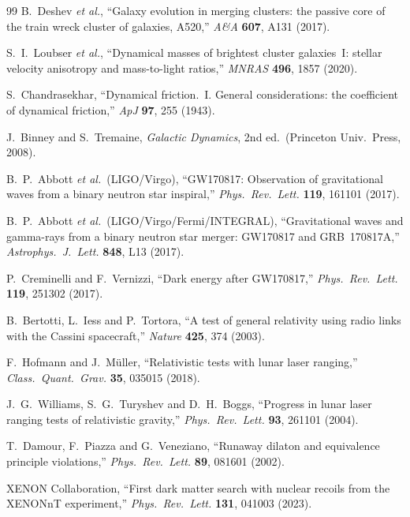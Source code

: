 \documentclass[aps,prd,twocolumn,nofootinbib,floatfix,superscriptaddress]{revtex4-2}
\begin{document}
\begin{thebibliography}{99}
 B.~Deshev \emph{et al.}, ``Galaxy evolution in
merging clusters: the passive core of the train wreck cluster of
galaxies, A520,'' \textit{A\&A} \textbf{607}, A131 (2017).

 S.~I.~Loubser \emph{et al.}, ``Dynamical masses
of brightest cluster galaxies~I: stellar velocity anisotropy and
mass-to-light ratios,'' \textit{MNRAS} \textbf{496}, 1857 (2020).

 S.~Chandrasekhar, ``Dynamical friction.~I.
General considerations: the coefficient of dynamical friction,''
\textit{ApJ} \textbf{97}, 255 (1943).

 J.~Binney and S.~Tremaine,
\textit{Galactic Dynamics}, 2nd ed.\ (Princeton Univ.~Press, 2008).


 B.~P.~Abbott \emph{et al.}\ (LIGO/Virgo),
``GW170817: Observation of gravitational waves from a binary neutron
star inspiral,'' \textit{Phys.~Rev.~Lett.} \textbf{119}, 161101 (2017).

 B.~P.~Abbott \emph{et al.}\
(LIGO/Virgo/Fermi/INTEGRAL), ``Gravitational waves and gamma-rays
from a binary neutron star merger: GW170817 and GRB~170817A,''
\textit{Astrophys.~J.~Lett.} \textbf{848}, L13 (2017).

 P.~Creminelli and F.~Vernizzi, ``Dark
energy after GW170817,'' \textit{Phys.~Rev.~Lett.} \textbf{119},
251302 (2017).

 B.~Bertotti, L.~Iess and P.~Tortora, ``A test
of general relativity using radio links with the Cassini spacecraft,''
\textit{Nature} \textbf{425}, 374 (2003).

 F.~Hofmann and J.~M\"uller, ``Relativistic tests
with lunar laser ranging,'' \textit{Class.~Quant.~Grav.} \textbf{35},
035015 (2018).

 J.~G.~Williams, S.~G.~Turyshev and
D.~H.~Boggs, ``Progress in lunar laser ranging tests of relativistic
gravity,'' \textit{Phys.~Rev.~Lett.} \textbf{93}, 261101 (2004).

 T.~Damour, F.~Piazza and G.~Veneziano,
``Runaway dilaton and equivalence principle violations,''
\textit{Phys.~Rev.~Lett.} \textbf{89}, 081601 (2002).


 XENON Collaboration, ``First dark matter search
with nuclear recoils from the XENONnT experiment,''
\textit{Phys.~Rev.~Lett.} \textbf{131}, 041003 (2023).


\end{thebibliography}
\end{document}

